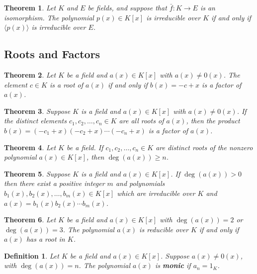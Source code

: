 \documentclass[letterpaper, 12pt]{article}
\newcommand{\pid}[1]{\langle #1 \rangle}
\newtheorem{defn}{Definition}
\newtheorem{thm}{Theorem}
\begin{document}
			\begin{thm}
			Let $K$ and $E$ be fields, and suppose that $\bar{f} : K \to E$ is an \textit{isomorphism}. 
			The polynomial $p(x) \in K[x]$ is irreducible over $K$ if and only if $\pid{p(x)}$ is irreducible over $E$.
			\end{thm}

		\subsection{Roots and Factors}
		\label{sec:roots_and_factors}
			\begin{thm}
			Let $K$ be a field and $a(x) \in K[x]$ with $a(x) \neq 0(x)$. 
			The element $c \in K$ is a root of $a(x)$ if and only if $b(x) = -c + x$ is a factor of $a(x)$.
			\end{thm}

			\setcounter{thm}{16}
			\begin{thm}
			Suppose $K$ is a field and $a(x) \in K[x]$ with $a(x) \neq 0(x)$. 
			If the distinct elements $c_{1}, c_{2}, \dots , c_{n} \in K$ are all roots of $a(x)$, then the product $b(x) = (-c_{1} + x)( -c_{2} + x) \cdots (-c_{n} + x)$ is a factor of $a(x)$.
			\end{thm}

			\setcounter{thm}{18}
			\begin{thm}
			Let $K$ be a field. 
			If $c_{1}, c_{2}, \dots , c_{n} \in K$ are distinct roots of the nonzero polynomial $a(x) \in K[x]$, then $\deg(a(x)) \geq n$.
			\end{thm}

			\begin{thm}
			Suppose $K$ is a field and $a(x) \in K[x]$. 
			If $\deg(a(x)) > 0$ then there exist a positive integer $m$ and polynomials $b_{1}(x),b_{2}(x), \dots ,b_{m}(x) \in K[x]$ which are irreducible over $K$ and $a(x) = b_{1}(x)b_{2}(x)\cdots b_{m}(x)$.
			\end{thm}

			\setcounter{thm}{21}
			\begin{thm}
			Let $K$ be a field and $a(x) \in K[x]$ with $\deg(a(x)) = 2$ or $\deg(a(x)) = 3$. 
			The polynomial $a(x)$ is reducible over $K$ if and only if $a(x)$ has a root in $K$.
			\end{thm}

			\setcounter{defn}{23}
			\begin{defn}
			Let $K$ be a field and $a(x) \in K[x]$. 
			Suppose $a(x) \neq 0(x)$, with $\deg(a(x)) = n$. 
			The polynomial $a(x)$ is \textbf{\textit{monic}} if $a_{n} = 1_{K}$.
			\end{defn}
\end{document}
